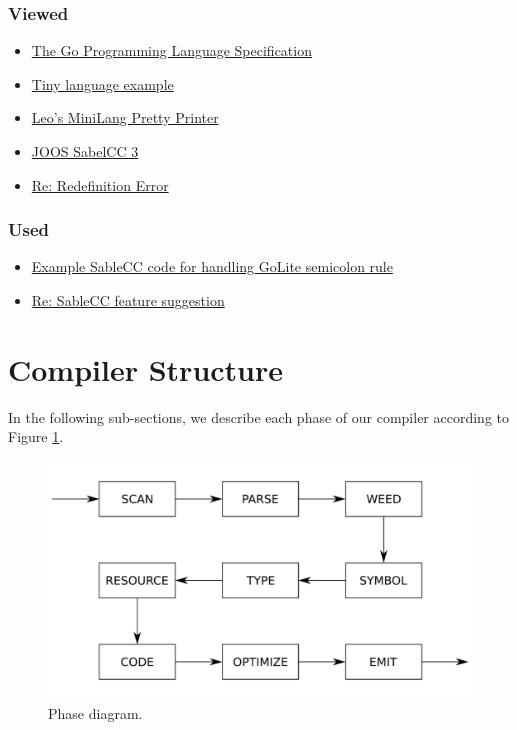 \documentclass{article}
\begin{document}
\subsubsection{Viewed}
\begin{itemize}
\item \href{https://golang.org/ref/spec}{The Go Programming Language Specification}
\item \href{http://www.sable.mcgill.ca/~hendren/520/2016/tiny/}{Tiny language example}
\item \href{https://github.com/leo-teng-long/minipart2/blob/master/src/mini/PrettyPrinter.java}{Leo's MiniLang Pretty Printer}
\item \href{http://www.sable.mcgill.ca/~hendren/520/2016/joos/jjoos-scc-3/}{JOOS SabelCC 3}
\item \href{http://www.sable.mcgill.ca/listarchives/sablecc-list/msg00639.html}{Re: Redefinition Error}
\end{itemize}

\subsubsection{Used}
\begin{itemize}
\item \href{http://www.sable.mcgill.ca/~hendren/520/2016/semicolon-test/}{Example SableCC code for handling GoLite semicolon rule}
\item \href{http://lists.sablecc.org/pipermail/sablecc-discussion/msg00144.html}{Re: SableCC feature suggestion}
\end{itemize}
\section{Compiler Structure}

In the following sub-sections, we describe each phase of our compiler according to Figure \ref{fig:phase}.

\begin{figure}[h]
  \centering
  \includegraphics[width=\linewidth]{phase.pdf}
  \caption{Phase diagram.}
  \label{fig:phase}
\end{figure}
\end{document}
